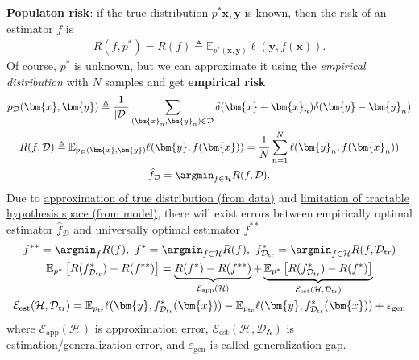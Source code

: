 \textbf{Populaton risk}: if the true distribution $p^*{\bm{x}, \bm{y}}$ is known, 
then the risk of an estimator $f$ is 
\begin{gather}
    R(f,p^*)=R(f)\triangleq\mathbb{E}_{p^*(\bm{x},\bm{y})}\ell(\bm{y},f(\bm{x})).
\end{gather}
Of course, $p^*$ is unknown, 
but we can approximate it using the \textit{empirical distribution} with $N$ samples
and get \textbf{empirical risk}
\begin{gather}
    p_{\mathcal{D}}(\bm{x},\bm{y})
    \triangleq
    \frac{1}{|\mathcal{D}|}\sum_{(\bm{x}_n,\bm{y}_n)\in\mathcal{D}}\delta(\bm{x}-\bm{x}_n)\delta(\bm{y}-\bm{y}_n) \\
    R(f,\mathcal{D})
    \triangleq
    \mathbb{E}_{p_{\mathcal{D}}(\bm{x},\bm{y})}\ell(\bm{y},f(\bm{x}))=\frac{1}{N}\sum_{n=1}^N\ell(\bm{y}_n,f(\bm{x}_n))\\
    \hat{f}_\mathcal{D}=\argmin_{f\in\mathcal{H}}R(f,\mathcal{D}).
\end{gather}
Due to \uline{approximation of true distribution (from data)} and \uline{limitation of tractable hypothesis space (from model)}, 
there will exist errors between empirically optimal estimator $\hat{f}_\mathcal{D}$ and universally optimal estimator $f^{**}$
\begin{gather}
    f^{**}=\argmin_f R(f),~
    f^*=\argmin_{f\in\mathcal{H}} R(f),~
    f^*_{\mathcal{D}_\text{tr}}=\argmin_{f\in\mathcal{H}}R(f,\mathcal{D}_\text{tr})\\
    \mathbb{E}_{p^*}\left[R(f^*_{\mathcal{D}_\text{tr}})-R(f^{**})\right]
    =\underbrace{R(f^*)-R(f^{**})}_{\mathcal{E}_\text{app}(\mathcal{H})}
    +\underbrace{\mathbb{E}_{p^*}\left[R(f^*_{\mathcal{D}_\text{tr}})-R(f^*)\right]}_{\mathcal{E}_\text{est}(\mathcal{H,\mathcal{D}_\text{tr}})}\\
    \mathcal{E}_\text{est}(\mathcal{H,\mathcal{D}_\text{tr}})
    = \mathbb{E}_{p_\text{tr}}\ell{(\bm{y},f^*_{\mathcal{D}_\text{tr}}(\bm{x}))}
    - \mathbb{E}_{p_\text{te}}\ell{(\bm{y},f^*_{\mathcal{D}_\text{tr}}(\bm{x}))} + \varepsilon_\text{gen}
\end{gather}
where 
$\mathcal{E}_\text{app}(\mathcal{H})$ is approximation error, 
$\mathcal{E}_\text{est}(\mathcal{H,\mathcal{D}_\text{tr}})$ is estimation/generalization error,
and $\varepsilon_\text{gen}$ is called generalization gap.

